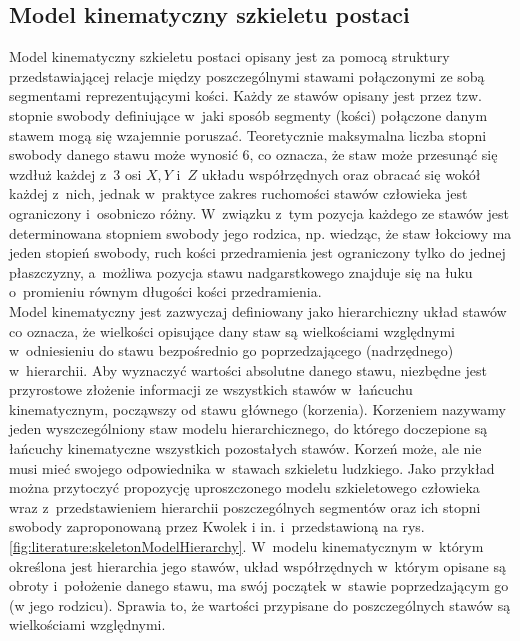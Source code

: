 \subsection{Model kinematyczny szkieletu postaci}
Model kinematyczny szkieletu postaci opisany jest za pomocą struktury przedstawiającej relacje między poszczególnymi stawami połączonymi ze sobą segmentami reprezentującymi kości. Każdy ze stawów opisany jest przez tzw. stopnie swobody definiujące w~jaki sposób segmenty (kości) połączone danym stawem mogą się wzajemnie poruszać. Teoretycznie maksymalna liczba stopni swobody danego stawu może wynosić 6, co oznacza, że staw może przesunąć się wzdłuż każdej z~3 osi $X, Y$ i~$Z$ układu współrzędnych oraz obracać się wokół każdej z~nich, jednak w~praktyce zakres ruchomości stawów człowieka jest ograniczony i~osobniczo różny. W~związku z~tym pozycja każdego ze stawów jest determinowana stopniem swobody jego rodzica, np. wiedząc, że staw łokciowy ma jeden stopień swobody, ruch kości przedramienia jest ograniczony tylko do jednej płaszczyzny, a~możliwa pozycja stawu nadgarstkowego znajduje się na łuku o~promieniu równym długości kości przedramienia.\\

Model kinematyczny jest zazwyczaj definiowany jako hierarchiczny układ stawów co oznacza, że wielkości opisujące dany staw są wielkościami względnymi w~odniesieniu do stawu bezpośrednio go poprzedzającego (nadrzędnego) w~hierarchii. Aby wyznaczyć wartości absolutne danego stawu, niezbędne jest przyrostowe złożenie informacji ze wszystkich stawów w~łańcuchu kinematycznym, począwszy od stawu głównego (korzenia). Korzeniem nazywamy jeden wyszczególniony staw modelu hierarchicznego, do którego doczepione są łańcuchy kinematyczne wszystkich pozostałych stawów. Korzeń może, ale nie musi mieć swojego odpowiednika w~stawach szkieletu ludzkiego. Jako przykład można przytoczyć propozycję uproszczonego modelu szkieletowego człowieka wraz z~przedstawieniem hierarchii poszczególnych segmentów oraz ich stopni swobody zaproponowaną przez Kwolek i in.\cite{Kwolek2014} i~przedstawioną na rys. \ref{fig:literature:skeletonModelHierarchy}. W~modelu kinematycznym w~którym określona jest hierarchia jego stawów, układ współrzędnych w~którym opisane są obroty i~położenie danego stawu, ma swój początek w~stawie poprzedzającym go (w jego rodzicu). Sprawia to, że wartości przypisane do poszczególnych stawów są wielkościami względnymi.


